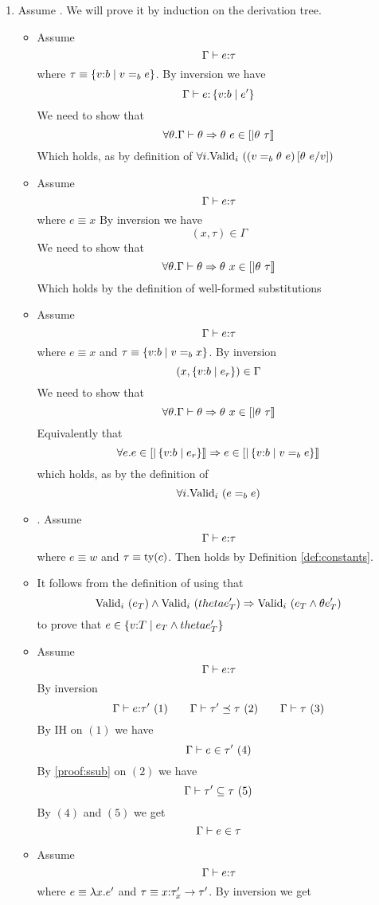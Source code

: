 \begin{enumerate}
\item Assume . 
We will prove it by induction on the derivation tree.

\begin{itemize}
\item \rtexact Assume
$$\Gamma \vdash e \text{:} \tau$$
where $\tau \equiv \left\lbrace v \text{:} b \mid v =_{b} e \right\rbrace$.
By inversion we have
$$\Gamma \vdash e \text{:} \left\lbrace v \text{:} b \mid e' \right\rbrace$$
We need to show that 
$$	\forall \theta . \iswellformed{\Gamma}{\theta} \Rightarrow \theta\ e \in \interp{\theta \ \tau}$$
Which holds, as by definition of 
$\generalconditionImplOne{(v \eqb{b} \theta\ e)\sub{v}{\theta\ e}}$
\item\rtvar Assume
$$	\Gamma \vdash e \text{:} \tau$$
where $e \equiv x$
By inversion we have
$$(x,\tau) \in \Gamma$$
We need to show that 
$$	\forall \theta . \iswellformed{\Gamma}{\theta} \Rightarrow \theta\ x \in \interp{\theta \ \tau}$$
Which holds by the definition of well-formed substitutions
\item\rtvarbase Assume
$$\Gamma \vdash e \text{:} \tau$$
where $e\equiv x$ and $\tau\equiv\left\lbrace v \text{:} b \mid v=_{b}x \right\rbrace$.
By inversion
$$(x,\left\lbrace v \text{:} b \mid e_r \right\rbrace) \in \Gamma$$ 
We need to show that 
$$	\forall \theta . \iswellformed{\Gamma}{\theta} \Rightarrow \theta\ x \in \interp{\theta \ \tau}$$
Equivalently that 
$$\forall e.
 e\in[|\left\lbrace v \text{:} b \mid e_r \right\rbrace|] \Rightarrow e \in [|\left\lbrace v \text{:} b \mid v =_{b} e \right\rbrace|]$$
which holds, as by the definition of 
$$\forall i . \text{Valid}_{i}\ (e=_{b}e)$$
\item\rtconst. Assume
$$\Gamma \vdash e \text{:} \tau$$
where $e \equiv w$  and $\tau\equiv\text{ty}({c})$.
Then  holds by Definition \ref{def:constants}.
\item \rtcase It follows from the definition of 
using that $$\text{Valid}_{i}\ (e_T) \land \text{Valid}_{i}\ (theta e'_T) \Rightarrow \text{Valid}_{i}\ (e_T \land \theta e'_T)$$
to prove that $e \in {\ensuremath{\left\lbrace v \text{:} T \mid e_T \land theta e'_T \right\rbrace}}$
\item\rtsub Assume 
$$	\Gamma \vdash e \text{:} \tau$$
By inversion
$$
	\Gamma \vdash e \text{:} \tau'\ (1) \qquad
	\Gamma \vdash \tau' \preceq \tau\ (2) \qquad
	\Gamma \vdash \tau\ (3)
$$
By IH on $(1)$ we have
$$	\shastype{\Gamma}{e}{\tau'}\ (4)$$
By \ref{proof:ssub} on $(2)$ we have
$$	\sissubtype{\Gamma}{\tau'}{\tau}\ (5)$$
By $(4)$ and $(5)$ we get
$$	\Gamma \vdash e \in \tau$$
\item\rtfun Assume
$$	\Gamma \vdash e \text{:} \tau$$
where $e \equiv \lambda x . e'$ and 
$\tau \equiv x\text{:} \tau'_x \rightarrow \tau'$.
By inversion we get

\end{itemize}
\end{enumerate}
